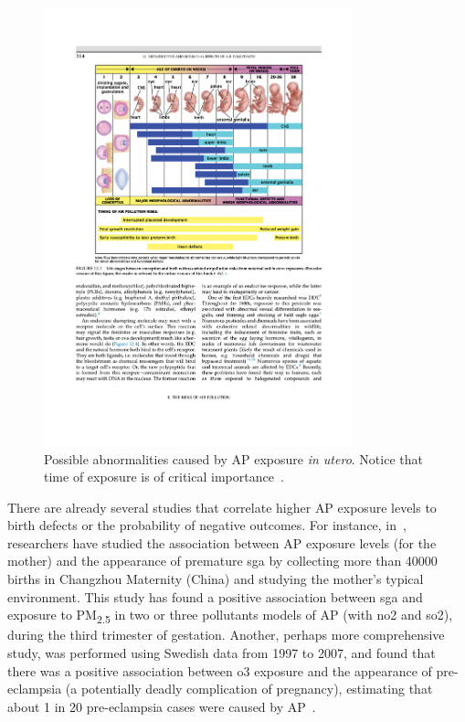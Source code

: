\begin{figure}[htpb]
    \centering
    \includegraphics[clip,%
        trim=3.4cm 12.2cm 3.4cm 3.6cm,%
        width=0.8\textwidth]{img/pdf/development.pdf}
    \caption{Possible abnormalities caused by \gls{AP} exposure \emph{in
    utero}. Notice that time of exposure is of critical
    importance~\cite{Vallero2014}.}
    \label{fig:AP_in_utero}
\end{figure}

There are already several studies that correlate higher \gls{AP}
exposure levels to birth defects or the probability of negative
outcomes. For instance, in~\cite{Li2019}, researchers have studied the
association between \gls{AP} exposure levels (for the mother) and the
appearance of premature \gls{sga} by collecting more than 40000 births
in Changzhou Maternity (China) and studying the mother's typical
environment. This study has found a positive association between
\gls{sga} and exposure to \gls{PM}\textsubscript{2.5} in two or three
pollutants models of \gls{AP} (with \gls{no2} and \gls{so2}), during the
third trimester of gestation. Another, perhaps more comprehensive study,
was performed using Swedish data from 1997 to 2007, and found that there
was a positive association between \gls{o3} exposure and the appearance
of pre-eclampsia (a potentially deadly complication of pregnancy),
estimating that about 1 in 20 pre-eclampsia cases were caused by
\gls{AP}~\cite{Olsson2013}.

